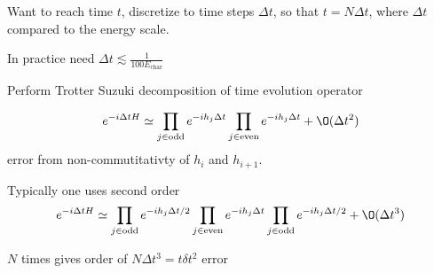 \documentclass[a4paper]{article}
\begin{document}
Want to reach time $t$, discretize to time steps $\Delta t$, so that $t=N\Delta
t$, where $\Delta t$ compared to the energy scale. 
\begin{remark}
    In practice need $\Delta t \lesssim \frac{1}{100 E_\mathrm{char}}$
\end{remark}
Perform Trotter Suzuki decomposition of time evolution operator 

\[
    e^{-i\Delta t H} \simeq \prod_{j\in \text{odd}} e^{-ih_j\Delta t}\prod_{j\in
    \text{even}} e^{-i h_j\Delta t} + \O(\Delta t^2)
\]
error from non-commutitativty of $h_i$ and $h_{i+1}$.
\begin{remark}
    Typically one uses second order 
\[

    e^{-i\Delta t H} \simeq \prod_{j\in \text{odd}} e^{-ih_j\Delta t/2}\prod_{j\in
    \text{even}} e^{-i h_j\Delta t} \prod_{j\in \text{odd}} e^{-ih_j\Delta t/2}
    +\O(\Delta t^3)
\]
\end{remark}
$N$ times gives order of $N\Delta t^3=t \delta t^2$ error
\end{document}

